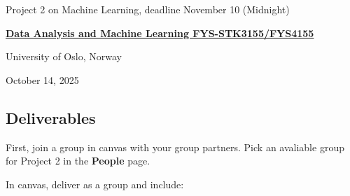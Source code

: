 \documentclass[%
oneside,                 %
final,                   %
10pt]{article}
\begin{document}

\newcommand{\exercisesection}[1]{\subsection*{#1}}






\thispagestyle{empty}

\begin{center}
{\LARGE\bf
\begin{spacing}{1.25}
Project 2 on Machine Learning, deadline November 10 (Midnight)
\end{spacing}
}
\end{center}


\begin{center}
{\bf \href{{http://www.uio.no/studier/emner/matnat/fys/FYS3155/index-eng.html}}{Data Analysis and Machine Learning FYS-STK3155/FYS4155}}
\end{center}

    \begin{center}
\centerline{{\small University of Oslo, Norway}}
\end{center}
    

\begin{center}
October 14, 2025
\end{center}

\vspace{1cm}


\subsection{Deliverables}

First, join a group in canvas with your group partners. Pick an avaliable group for Project 2 in the \textbf{People} page.

In canvas, deliver as a group and include:
\end{document}
